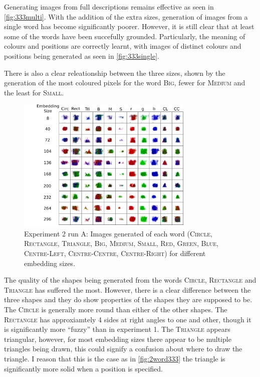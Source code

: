Generating images from full descriptions remains effective as seen in \autoref{fig:333multi}.
With the addition of the extra sizes, generation of images from a single word has become significantly poorer. However, it is still clear that at least some of the words have been succefully grounded. Particularly, the meaning of colours and positions are correctly learnt, with images of distinct colours and positions being generated as seen in \autoref{fig:333single}. 

There is also a clear releationship between the three sizes, shown by the generation of the most coloured pixels for the word \textsc{Big}, fewer for \textsc{Medium} and the least for \textsc{Small}.

\begin{figure}[h]
\centering
\includegraphics[width=0.75\textwidth]{Figs/shapes/singlelabel333A.png}
\caption{Experiment 2 run A: Images generated of each word (\textsc{Circle, Rectangle, Triangle, Big, Medium, Small, Red, Green, Blue, Centre-Left, Centre-Centre, Centre-Right}) for different embedding sizes.}
\label{fig:333single}
\end{figure} 

The quality of the shapes being generated from the words \textsc{Circle}, \textsc{Rectangle} and \textsc{Triangle} has suffered the most. However, there is a clear difference between the three shapes and they do show properties of the shapes they are supposed to be. The \textsc{Circle} is generally more round than either of the other shapes. The \textsc{Rectangle} has approxiamtely 4 sides at right angles to one and other, though it is significantly more ``fuzzy'' than in experiment 1. The \textsc{Triangle} appears triangular, however, for most embedding sizes there appear to be multiple triangles being drawn, this could signify a confusion about where to draw the triangle. I reason that this is the case as in \autoref{fig:2word333} the triangle is significantly more solid when a position is specified. 


